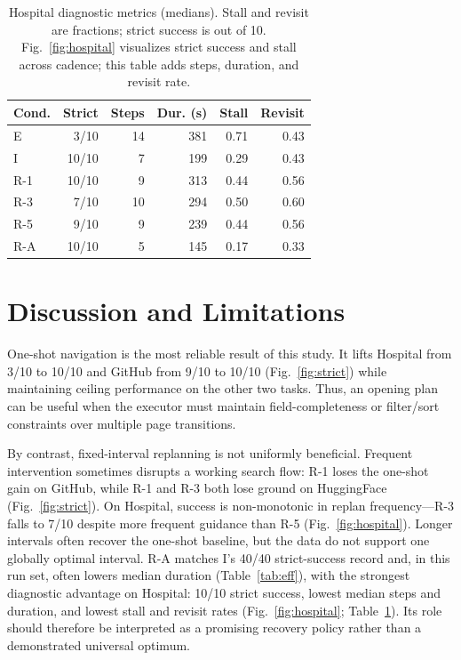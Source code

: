 \documentclass[runningheads]{llncs}
\begin{document}
\begin{table}[t]
\centering
\caption{Hospital diagnostic metrics (medians). Stall and revisit are
fractions; strict success is out of 10. Fig.~\ref{fig:hospital} visualizes
strict success and stall across cadence; this table adds steps, duration, and
revisit rate.}
\label{tab:hospital}
\small
\setlength{\tabcolsep}{5pt}
\begin{tabular}{@{}lrrrrr@{}}
\toprule
\textbf{Cond.} & \textbf{Strict} & \textbf{Steps} & \textbf{Dur. (s)} & \textbf{Stall} & \textbf{Revisit} \\
\midrule
E   & 3/10  & 14 & 381 & 0.71 & 0.43 \\
I   & 10/10 & 7  & 199 & 0.29 & 0.43 \\
R-1 & 10/10 & 9  & 313 & 0.44 & 0.56 \\
R-3 & 7/10  & 10 & 294 & 0.50 & 0.60 \\
R-5 & 9/10  & 9  & 239 & 0.44 & 0.56 \\
R-A & 10/10 & 5  & 145 & 0.17 & 0.33 \\
\bottomrule
\end{tabular}
\end{table}

\section{Discussion and Limitations}

One-shot navigation is the most reliable result of this study. It lifts
Hospital from 3/10 to 10/10 and GitHub from 9/10 to 10/10 (Fig.~\ref{fig:strict})
while maintaining ceiling performance on the other two tasks. Thus, an opening
plan can be useful when the executor must maintain field-completeness or
filter/sort constraints over multiple page transitions.

By contrast, fixed-interval replanning is not uniformly beneficial. Frequent
intervention sometimes disrupts a working search flow: R-1 loses the one-shot
gain on GitHub, while R-1 and R-3 both lose ground on HuggingFace
(Fig.~\ref{fig:strict}). On Hospital, success is non-monotonic in replan
frequency---R-3 falls to 7/10 despite more frequent guidance than R-5
(Fig.~\ref{fig:hospital}). Longer intervals often recover the one-shot baseline,
but the data do not support one globally optimal interval. R-A matches I's
40/40 strict-success record and, in this run set, often lowers median duration
(Table~\ref{tab:eff}), with the strongest diagnostic advantage on Hospital:
10/10 strict success, lowest median steps and duration, and lowest stall and
revisit rates (Fig.~\ref{fig:hospital}; Table~\ref{tab:hospital}). Its role
should therefore be interpreted as a promising recovery policy rather than a
demonstrated universal optimum.
\end{document}
